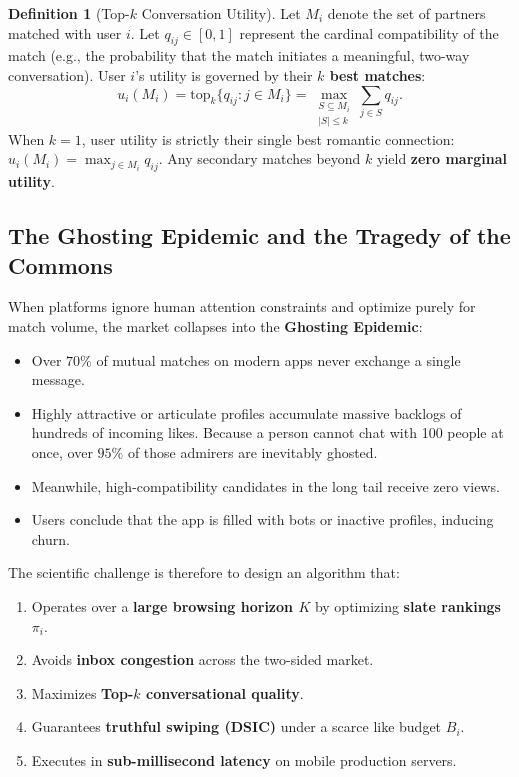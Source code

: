 \documentclass[11pt,letterpaper]{article}
\theoremstyle{definition}
\newtheorem{definition}{Definition}[section]
\theoremstyle{plain}
\theoremstyle{remark}
\begin{document}
\begin{definition}[Top-$k$ Conversation Utility]
Let $M_i$ denote the set of partners matched with user $i$. Let $q_{ij} \in [0, 1]$ represent the cardinal compatibility of the match (e.g., the probability that the match initiates a meaningful, two-way conversation). User $i$'s utility is governed by their \textbf{$k$ best matches}:
\begin{equation}
    u_i(M_i) = \mathrm{top}_k \{ q_{ij} : j \in M_i \} = \max_{\substack{S \subseteq M_i \\ |S| \le k}} \sum_{j \in S} q_{ij}.
\end{equation}
When $k=1$, user utility is strictly their single best romantic connection: $u_i(M_i) = \max_{j \in M_i} q_{ij}$. Any secondary matches beyond $k$ yield \textbf{zero marginal utility}.
\end{definition}

\subsection{The Ghosting Epidemic and the Tragedy of the Commons}
When platforms ignore human attention constraints and optimize purely for match volume, the market collapses into the \textbf{Ghosting Epidemic}:
\begin{itemize}[leftmargin=2em]
    \item Over $70\%$ of mutual matches on modern apps never exchange a single message.
    \item Highly attractive or articulate profiles accumulate massive backlogs of hundreds of incoming likes. Because a person cannot chat with 100 people at once, over $95\%$ of those admirers are inevitably ghosted.
    \item Meanwhile, high-compatibility candidates in the long tail receive zero views.
    \item Users conclude that the app is filled with bots or inactive profiles, inducing churn.
\end{itemize}

The scientific challenge is therefore to design an algorithm that:
\begin{enumerate}[leftmargin=2em]
    \item Operates over a \textbf{large browsing horizon $K$} by optimizing \textbf{slate rankings $\pi_i$}.
    \item Avoids \textbf{inbox congestion} across the two-sided market.
    \item Maximizes \textbf{Top-$k$ conversational quality}.
    \item Guarantees \textbf{truthful swiping (DSIC)} under a scarce like budget $B_i$.
    \item Executes in \textbf{sub-millisecond latency} on mobile production servers.
\end{enumerate}
\end{document}
